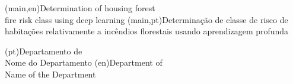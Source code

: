 
%


\nttitle(main,en){Determination of housing forest \\fire risk class using deep learning}%
\nttitle(main,pt){Determinação de classe de risco de \\habitações relativamente a incêndios florestais usando aprendizagem profunda}%



\ntdepartment*(pt){Departamento de\\Nome do Departamento}
\ntdepartment*(en){Department of\\Name of the Department}

